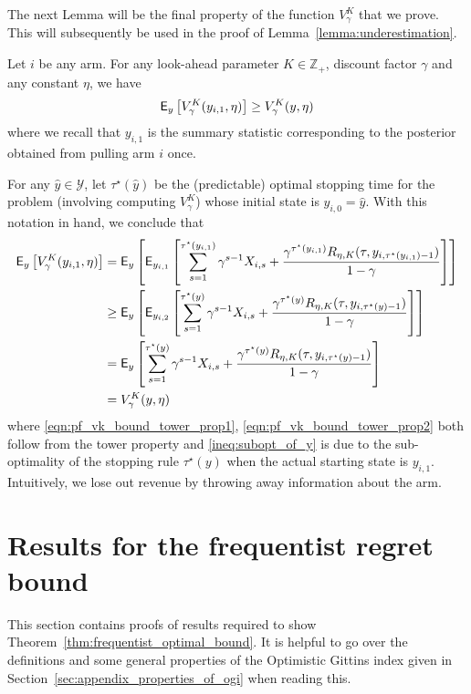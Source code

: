 The next Lemma will be the final property of the function $V^K_\gamma$ that we prove. This will subsequently be used in the proof of Lemma~\ref{lemma:underestimation}.
\begin{lemma} \label{lemma:vk_bound}
	Let $i$ be any arm. For any look-ahead parameter $K \in \mathbb{Z}_+$, discount factor $\gamma$ and any constant $\eta$, we have
	\begin{equation*}
	\mathsf{E}_y\left[V^K_\gamma(y_{i,1}, \eta) \right] \ge V^K_\gamma(y, \eta)
	\end{equation*}
	where we recall that $y_{i,1}$ is the summary statistic corresponding to the posterior obtained from pulling arm $i$ once.
\end{lemma}
\begin{myproof}[Proof.]
	For any $\hat y \in \mathcal{Y}$, let $\tau^\star(\hat y)$ be the (predictable) optimal stopping time for the problem (involving computing $V^K_\gamma$) whose initial state is $y_{i,0} = \hat y$. With this notation in hand, we conclude that
	\begin{align}
	\mathsf{E}_y \left[V^K_\gamma(y_{i,1}, \eta) \right] & = \mathsf{E}_y\left[\mathsf{E}_{y_{i,1}}\left[\sum_{s=1}^{\tau^\star(y_{i,1})} \gamma^{s-1} X_{i,s} + \frac{\gamma^{\tau^\star(y_{i,1})} R_{\eta, K}(\tau, y_{i,\tau^\star(y_{i,1})-1})}{1-\gamma} \right]\right]\label{eqn:pf_vk_bound_tower_prop1}  \\
	& \ge  \mathsf{E}_y\left[\mathsf{E}_{y_{i,2}}\left[\sum_{s=1}^{\tau^\star(y)} \gamma^{s-1} X_{i,s} + \frac{\gamma^{\tau^\star(y)} R_{\eta, K}(\tau, y_{i,\tau^\star(y)-1})}{1-\gamma}\right] \right] \label{ineq:subopt_of_y}\\
	& = \mathsf{E}_y\left[\sum_{s=1}^{\tau^\star(y)} \gamma^{s-1} X_{i,s} + \frac{\gamma^{\tau^\star(y)} R_{\eta, K}(\tau, y_{i,\tau^\star(y)-1})}{1-\gamma}\right] \label{eqn:pf_vk_bound_tower_prop2} \\
	& = V^K_\gamma(y, \eta) \nonumber
	\end{align}
	where \eqref{eqn:pf_vk_bound_tower_prop1}, \eqref{eqn:pf_vk_bound_tower_prop2} both follow from the tower property and \eqref{ineq:subopt_of_y} is due to the sub-optimality of the stopping rule $\tau^\star(y)$ when the actual starting state is $y_{i,1}$. Intuitively, we lose out revenue by throwing away information about the arm.
\end{myproof}


\section{Results for the frequentist regret bound}
This section contains proofs of results required to show Theorem~\ref{thm:frequentist_optimal_bound}. It is helpful to go over the definitions and some general properties of the Optimistic Gittins index given in Section~\ref{sec:appendix_properties_of_ogi} when reading this.
